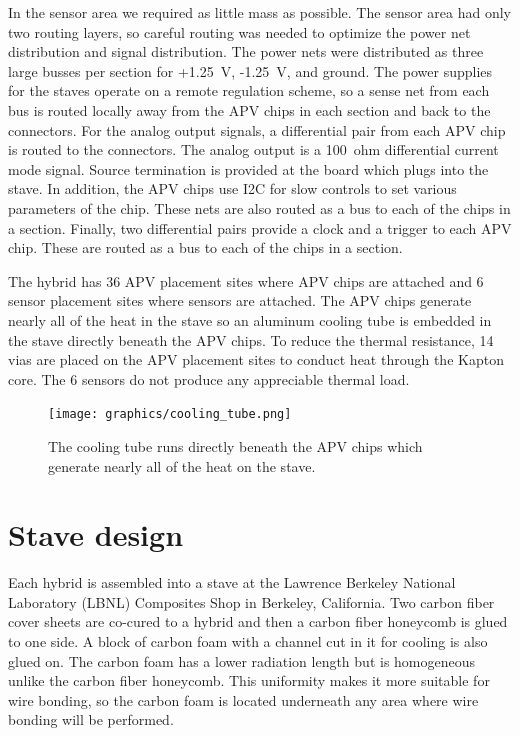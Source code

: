 \documentclass[preprint,12pt]{elsarticle}
\begin{document}
In the sensor area we required as little mass as possible. The sensor area had
only two routing layers, so careful routing was needed to optimize the power net
distribution and signal distribution. The power nets were distributed as three
large busses per section for +1.25~V, -1.25~V, and ground. The power supplies
for the staves operate on a remote regulation scheme, so a sense net from each bus is
routed locally away from the APV chips in each section and back to the
connectors. For
the analog output signals, a differential pair from each APV chip is routed to the
connectors. The analog output is a 100~ohm differential current mode signal. Source
termination is provided at the board which plugs into the stave. In addition,
the APV chips use I2C for slow controls to set various parameters of the chip.
These nets are also routed as a bus to each of the chips in a section. Finally,
two differential pairs provide a clock and a trigger to each APV chip. These
are routed as a bus to each of the chips in a section. 

The hybrid has 36 APV placement sites where APV chips are attached and 6 sensor
placement sites where sensors are attached. The APV chips generate nearly all of
the heat in the stave so an aluminum cooling tube is embedded in the stave
directly beneath the APV chips. To reduce the thermal resistance, 14 vias are placed on the APV
placement sites to conduct heat through the Kapton core. The 6 sensors do not
produce any appreciable thermal load.

\begin{figure}[ht]
\begin{center}
\texttt{[image: graphics/cooling\_tube.png]}
\caption{The cooling tube runs directly beneath the APV chips which generate nearly
all of the heat on the stave.
\label{fig:cooling_tube}}
\end{center}
\end{figure}

\section{Stave design}
Each hybrid is assembled into a stave at the Lawrence Berkeley National Laboratory (LBNL) Composites Shop in Berkeley,
California. Two carbon fiber cover sheets are co-cured to a hybrid and then a
carbon fiber honeycomb is glued to one side. A block of carbon foam with a
channel cut in it for cooling is also glued on. The carbon foam has a lower
radiation length but is homogeneous unlike the carbon fiber honeycomb. This
uniformity makes it more suitable for wire bonding, so the carbon foam is
located underneath any area where wire bonding will be performed.
\end{document}
